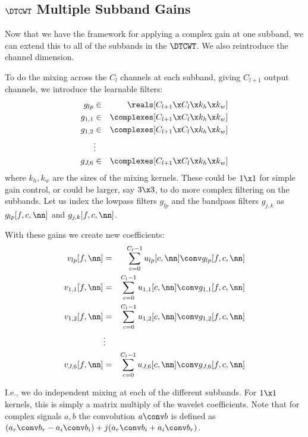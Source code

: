 \subsection{$\DTCWT$ Multiple Subband Gains}\label{sec:ch6:multiple_subbands}

Now that we have the framework for applying a complex gain at one subband, we
can extend this to all of the subbands in the $\DTCWT$. We also reintroduce the channel
dimension. 

To do the mixing across the $C_l$ channels at each subband, giving $C_{l+1}$
output channels, we introduce the learnable filters:
%
\begin{eqnarray}
  g_{lp} &\in& \reals[C_{l+1}\x C_l\x k_h\x k_w] \label{eq:ch6:glp} \\
  g_{1,1} &\in& \complexes[C_{l+1}\x C_l\x k_h\x k_w] \\
  g_{1,2} &\in& \complexes[C_{l+1}\x C_l\x k_h\x k_w] \\
      & \vdots &\\
  g_{J,6} &\in& \complexes[C_{l+1}\x C_l\x k_h\x k_w]  \label{eq:ch6:gj6}
\end{eqnarray}
%
where $k_h, k_w$ are the sizes of the mixing kernels. These could be $1\x 1$ for
simple gain control, or could be larger, say $3\x 3$, to do more complex
filtering on the subbands. Let us index the lowpass filters $g_{lp}$ and the
bandpass filters $g_{j,k}$ as $g_{lp}[f, c, \nn]$ and $g_{j,k}[f, c, \nn]$.

With these gains we create new coefficients:
\begin{eqnarray}
  v_{lp}[f, \nn] &= & \sum_{c=0}^{C_l-1} u_{lp}[c, \nn] \conv g_{lp}[f, c, \nn] \\
  v_{1,1}[f, \nn] &= & \sum_{c=0}^{C_l-1} u_{1,1}[c, \nn] \conv g_{1,1}[f, c, \nn] \\
  v_{1,2}[f, \nn] &= & \sum_{c=0}^{C_l-1} u_{1,2}[c, \nn] \conv g_{1,2}[f, c, \nn] \\
                  & \vdots & \\
  v_{J,6}[f, \nn] &= & \sum_{c=0}^{C_l-1} u_{J,6}[c, \nn] \conv g_{J,6}[f, c, \nn] 
\end{eqnarray}

I.e., we do independent mixing at each of the different subbands. For $1\x 1$
kernels, this is simply a matrix multiply of the wavelet coefficients. Note that
for complex signals $a, b$ the convolution $a \conv b$ is defined as $(a_r \conv
b_r - a_i \conv b_i) + j(a_r \conv b_i + a_i \conv b_r)$.


